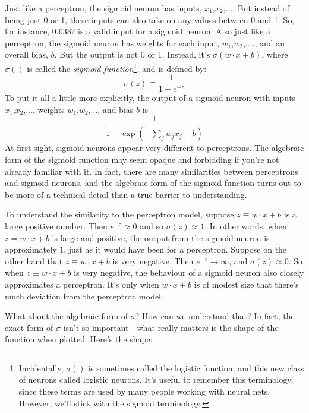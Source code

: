 Just like a perceptron, the sigmoid neuron has inputs, $x_1$,$x_2$,$\ldots$. But instead of being just 0 or 1, these inputs can also take on any values between 0 and 1. So, for instance, 0.638? is a valid input for a sigmoid neuron. Also just like a perceptron, the sigmoid neuron has weights for each input, $w_1$,$w_2$,,$\ldots$, and an overall bias, $b$. But the output is not 0 or 1. Instead, it's $\sigma(w \cdot x+b)$, where $\sigma()$ is called the \textit{sigmoid function}\footnote{Incidentally, $\sigma()$ is sometimes called the logistic function, and this new class of neurons called logistic neurons. It's useful to remember this terminology, since these terms are used by many people working with neural nets. However, we'll stick with the sigmoid terminology.}, and is defined by: 
\begin{equation}
\sigma(z) \equiv \frac{1}{1+e^{-z}}\label{eq:sigmoidfunction}
\end{equation}
To put it all a little more explicitly, the output of a sigmoid neuron with inputs $x_1$,$x_2$,$\ldots$, weights $w_1$,$w_2$,$\ldots$, and bias $b$ is 
\begin{equation}
\frac{1}{1+\exp \left(-\sum_{j} w_{j} x_{j}-b\right)}
\end{equation}
At first sight, sigmoid neurons appear very different to perceptrons. The algebraic form of the sigmoid function may seem opaque and forbidding if you're not already familiar with it. In fact, there are many similarities between perceptrons and sigmoid neurons, and the algebraic form of the sigmoid function turns out to be more of a technical detail than a true barrier to understanding.

To understand the similarity to the perceptron model, suppose $z \equiv w \cdot x+b$ is a large positive number. Then $e^{-z} \approx 0$ and so $\sigma(z) \approx 1$. In other words, when $z=w \cdot x+b$ is large and positive, the output from the sigmoid neuron is approximately 1, just as it would have been for a perceptron. Suppose on the other hand that $z \equiv w \cdot x+b$ is very negative. Then $e^{-z} \rightarrow \infty$, and $\sigma(z) \approx 0$. So when $z \equiv w \cdot x+b$ is very negative, the behaviour of a sigmoid neuron also closely approximates a perceptron. It's only when $w \cdot x+b$ is of modest size that there's much deviation from the perceptron model.

What about the algebraic form of $\sigma$? How can we understand that? In fact, the exact form of $\sigma$ isn't so important - what really matters is the shape of the function when plotted. Here's the shape:

